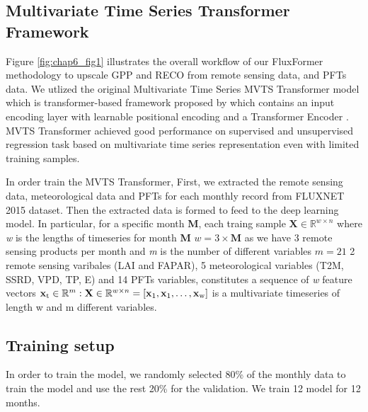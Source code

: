 \subsection{Multivariate Time Series Transformer Framework}
Figure \ref{fig:chap6_fig1} illustrates the overall workflow of our FluxFormer methodology to upscale GPP and RECO from remote sensing data, and PFTs data. We utlized the original Multivariate Time Series MVTS Transformer model which is transformer-based framework proposed by \citep{zerveas2021transformer} which contains an input encoding layer with learnable positional encoding and a Transformer Encoder \citep{vaswani2017attention}. MVTS Transformer achieved good performance on supervised and unsupervised regression task based on multivariate time series representation even with limited training samples.  \par
In order train the MVTS Transformer, First, we extracted the remote sensing data, meteorological data and PFTs for each monthly record from FLUXNET 2015 dataset. Then the extracted data is formed to feed to the deep learning model. In particular, for a specific month \textbf{M}, each traing sample $\mathbf{X} \in \mathbb{R}^{w\times n}$ where \textit{w} is the lengths of timeseries for month \textbf{M} $\textit{w} = 3\times \textbf{M}$ as we have 3 remote sensing products per month and \textit{m} is the number of different variables  $\textit{m} = 21$ 2 remote sensing varibales (LAI and FAPAR), 5 meteorological variables (T2M, SSRD, VPD, TP, E) and 14 PFTs variables, constitutes a sequence of \textit{w} feature vectors $\mathbf{x}\textsubscript{t} \in \mathbb{R}^{m}: \mathbf{X} \in \mathbb{R}^{w\times n} = [\mathbf{x}\textsubscript{1},\mathbf{x}\textsubscript{1}, \dots, \mathbf{x}\textsubscript{w}]$ is a multivariate timeseries of length w and m different variables. \par

\subsection{Training setup}
In order to train the model, we randomly selected 80\% of the monthly data to train the model and use the rest 20\% for the validation. We train 12 model for 12 months. \par
